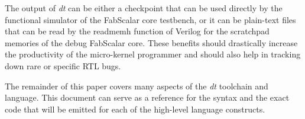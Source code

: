 The output of \emph{dt} can be either a checkpoint that can 
be used directly by the functional simulator of the 
FabScalar core testbench, or it can be plain-text files that 
can be read by the readmemh function 
of Verilog for the scratchpad memories of the debug FabScalar core.  
These benefits should drastically increase the 
productivity of the micro-kernel programmer and should also 
help in tracking down rare or specific RTL bugs.

The remainder of this paper covers many aspects of the \emph{dt}
toolchain and language.  This document can serve as a 
reference for the syntax and the exact code that will be 
emitted for each of the high-level language constructs.

